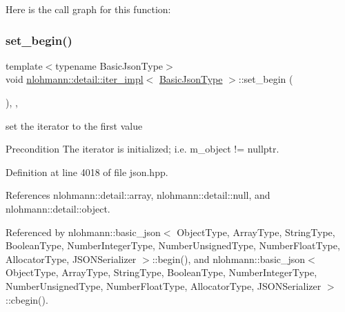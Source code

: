 Here is the call graph for this function\+:
\mbox{\label{classnlohmann_1_1detail_1_1iter__impl_a5d5f92c7f6848814bc82cf7e4e541820}} 
\subsubsection{\texorpdfstring{set\+\_\+begin()}{set\_begin()}}
{\footnotesize\ttfamily template$<$typename Basic\+Json\+Type$>$ \\
void \hyperlink{classnlohmann_1_1detail_1_1iter__impl}{nlohmann\+::detail\+::iter\+\_\+impl}$<$ \hyperlink{classnlohmann_1_1detail_1_1iter__impl_abf18f18793f84b0222aebb5a2a87da7a}{Basic\+Json\+Type} $>$\+::set\+\_\+begin (\begin{DoxyParamCaption}{ }\end{DoxyParamCaption})\hspace{0.3cm}{\ttfamily [inline]}, {\ttfamily [private]}, {\ttfamily [noexcept]}}



set the iterator to the first value 

\begin{DoxyPrecond}{Precondition}
The iterator is initialized; i.\+e. {\ttfamily m\+\_\+object != nullptr}. 
\end{DoxyPrecond}


Definition at line 4018 of file json.\+hpp.



References nlohmann\+::detail\+::array, nlohmann\+::detail\+::null, and nlohmann\+::detail\+::object.



Referenced by nlohmann\+::basic\+\_\+json$<$ Object\+Type, Array\+Type, String\+Type, Boolean\+Type, Number\+Integer\+Type, Number\+Unsigned\+Type, Number\+Float\+Type, Allocator\+Type, J\+S\+O\+N\+Serializer $>$\+::begin(), and nlohmann\+::basic\+\_\+json$<$ Object\+Type, Array\+Type, String\+Type, Boolean\+Type, Number\+Integer\+Type, Number\+Unsigned\+Type, Number\+Float\+Type, Allocator\+Type, J\+S\+O\+N\+Serializer $>$\+::cbegin().


